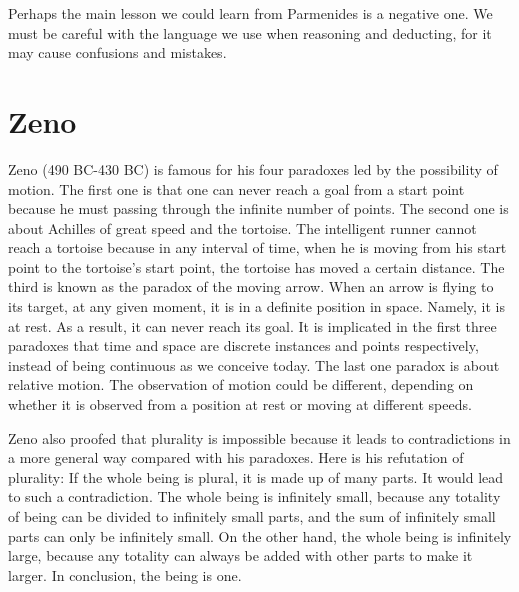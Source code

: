 \documentclass[11pt]{article}
\begin{document}
\newline

Perhaps the main lesson we could learn from Parmenides is a negative one. 
We must be careful with the language we use when reasoning and deducting, for it may cause confusions and mistakes. 

\section{Zeno}
Zeno (490 BC-430 BC) is famous for his four paradoxes led by the possibility of motion. 
The first one is that one can never reach a goal from a start point because he must passing through the infinite number of points. 
The second one is about Achilles of great speed and the tortoise. 
The intelligent runner cannot reach a tortoise because in any interval of time, when he is moving from his start point to the tortoise’s start point, the tortoise has moved a certain distance. 
The third is known as the paradox of the moving arrow. 
When an arrow is flying to its target, at any given moment, it is in a definite position in space. 
Namely, it is at rest. 
As a result, it can never reach its goal. 
It is implicated in the first three paradoxes that time and space are discrete instances and points respectively, instead of being continuous as we conceive today. 
The last one paradox is about relative motion. 
The observation of motion could be different, depending on whether it is observed from a position at rest or moving at different speeds. 

\newline

Zeno also proofed that plurality is impossible because it leads to contradictions in a more general way compared with his paradoxes. 
Here is his refutation of plurality: 
If the whole being is plural, it is made up of many parts. 
It would lead to such a contradiction. 
The whole being is infinitely small, because any totality of being can be divided to infinitely small parts, and the sum of infinitely small parts can only be infinitely small. 
On the other hand, the whole being is infinitely large, because any totality can always be added with other parts to make it larger. 
In conclusion, the being is one.
  
\end{document}
